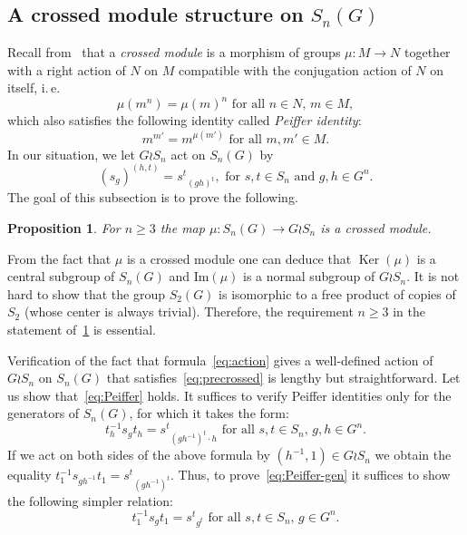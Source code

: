 \documentclass[oneside, 10pt]{amsart}
\theoremstyle{plain}
\numberwithin{equation}{section}
\numberwithin{lemma}{section}
\newtheorem{prop}[lemma]{Proposition}
\theoremstyle{remark}
\theoremstyle{definition}
\DeclareMathOperator{\Ker}{Ker}
\begin{document}
\subsection{A crossed module structure on $S_n(G)$}
Recall from~\cite[\S~2.2]{BHS11} that a {\it crossed module} is a morphism of groups $\mu\colon M\to N$ together with a right action of $N$ on $M$ 
compatible with the conjugation action of $N$ on itself, i.\,e.
\begin{equation} \label{eq:precrossed} \tag{CM1} \mu(m^n) = \mu(m)^n \text{ for all $n \in N$, $m \in M$}, \end{equation}
which also satisfies the following identity called {\it Peiffer identity}:
\begin{equation} \label{eq:Peiffer} \tag{CM2} m^{m'} = m^{\mu(m')} \text{ for all $m, m' \in M$}.\end{equation}
In our situation, we let $G \wr S_n$ act on $S_n(G)$ by 
\begin{equation} \label{eq:action} (s_g)^{(h, t)} = {s^t}_{(gh)^t}, \text{ for $s, t \in S_n$ and $g, h \in G^n$.} \end{equation}
The goal of this subsection is to prove the following.
\begin{prop} \label{thm:cms} For $n \geq 3$ the map $\mu \colon S_n(G) \to G \wr S_n $ is a crossed module. \end{prop}
From the fact that $\mu$ is a crossed module one can deduce that $\Ker(\mu)$ is a central subgroup of $S_n(G)$ and $\mathrm{Im}(\mu)$ is a normal subgroup of $G \wr S_n$.
It is not hard to show that the group $S_2(G)$ is isomorphic to a free product of copies of $S_2$ (whose center is always trivial).
Therefore, the requirement $n\geq 3$ in the statement of~\cref{thm:cms} is essential.

Verification of the fact that formula~\eqref{eq:action} gives a well-defined action of $G\wr S_n$ on $S_n(G)$ 
 that satisfies~\eqref{eq:precrossed} is lengthy but straightforward. Let us show that~\eqref{eq:Peiffer} holds. 
It suffices to verify Peiffer identities only for the generators of $S_n(G)$, for which it takes the form:
\begin{equation} \label{eq:Peiffer-gen} t^{-1}_h s_g t_h = {s^t}_{(gh^{-1})^t\cdot h} \text{ for all $s, t \in S_n$, $g, h\in G^n$.}\end{equation}
If we act on both sides of the above formula by $(h^{-1}, 1) \in G \wr S_n$ we obtain the equality
$t^{-1}_1 s_{gh^{-1}} t_1 = {s^t}_{(gh^{-1})^t}$.
Thus, to prove~\eqref{eq:Peiffer-gen} it suffices to show the following simpler relation:
\begin{equation} \label{eq:Peiffer-simple} t^{-1}_1 s_g t_1 = {s^t}_{g^t} \text{ for all $s, t \in S_n$, $g\in G^n$.}\end{equation}
\end{document}
